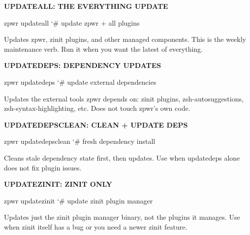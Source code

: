 \documentclass[11pt,a4paper,twoside]{book}
\begin{document}
\vspace{12pt}
{\bfseries\color{neonyellow} UPDATEALL: THE EVERYTHING UPDATE}\vspace{4pt}

\begin{codebox}
\color{neongreen}zpwr updateall                      {\char`\#} update zpwr + all plugins\\
\end{codebox}

Updates zpwr, zinit plugins, and other managed components. This is the weekly maintenance verb. Run it when you want the latest of everything.


\vspace{12pt}
{\bfseries\color{neonyellow} UPDATEDEPS: DEPENDENCY UPDATES}\vspace{4pt}

\begin{codebox}
\color{neongreen}zpwr updatedeps                     {\char`\#} update external dependencies\\
\end{codebox}

Updates the external tools zpwr depends on: zinit plugins, zsh-autosuggestions, zsh-syntax-highlighting, etc. Does not touch zpwr's own code.


\vspace{12pt}
{\bfseries\color{neonyellow} UPDATEDEPSCLEAN: CLEAN + UPDATE DEPS}\vspace{4pt}

\begin{codebox}
\color{neongreen}zpwr updatedepsclean                {\char`\#} fresh dependency install\\
\end{codebox}

Cleans stale dependency state first, then updates. Use when updatedeps alone does not fix plugin issues.


\vspace{12pt}
{\bfseries\color{neonyellow} UPDATEZINIT: ZINIT ONLY}\vspace{4pt}

\begin{codebox}
\color{neongreen}zpwr updatezinit                    {\char`\#} update zinit plugin manager\\
\end{codebox}

Updates just the zinit plugin manager binary, not the plugins it manages. Use when zinit itself has a bug or you need a newer zinit feature.
\end{document}
